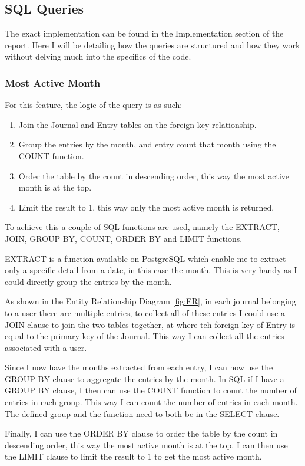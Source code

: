 \subsection{SQL Queries}
The exact implementation can be found in the Implementation section of the report. Here I will be detailing how the queries are structured and how they work without delving much into the specifics of the code.

\subsubsection{Most Active Month}
For this feature, the logic of the query is as such:
\begin{enumerate}
    \item Join the Journal and Entry tables on the foreign key relationship.
    \item Group the entries by the month, and entry count that month using the COUNT function.
    \item Order the table by the count in descending order, this way the most active month is at the top.
    \item Limit the result to 1, this way only the most active month is returned.

\end{enumerate}
To achieve this a couple of SQL functions are used, namely the EXTRACT, JOIN, GROUP BY, COUNT, ORDER BY and LIMIT functions.

EXTRACT is a function available on PostgreSQL which enable me to extract only a specific detail from a date, in this case the month. This is very handy as I could directly group the entries by the month.

As shown in the Entity Relationship Diagram \ref{fig:ER}, in each journal belonging to a user there are multiple entries, to collect all of these entries I could use a JOIN clause to join the two tables together, at where teh foreign key of Entry is equal to the primary key of the Journal. This way I can collect all the entries associated with a user.

Since I now have the months extracted from each entry, I can now use the GROUP BY clause to aggregate the entries by the month. In SQL if I have a GROUP BY clause, I then can use the COUNT function to count the number of entries in each group. This way I can count the number of entries in each month. The defined group and the function need to both be in the SELECT clause.

Finally, I can use the ORDER BY clause to order the table by the count in descending order, this way the most active month is at the top. I can then use the LIMIT clause to limit the result to 1 to get the most active month.

